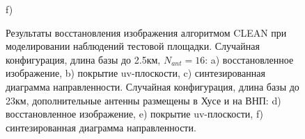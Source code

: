 \documentclass[10pt,a4paper]{article}
\begin{document}
\begin{figure}
\begin{minipage}[h]{0.47\linewidth}
\end{minipage}
\hfill
\begin{minipage}[h]{0.47\linewidth}
 f) \\
\end{minipage}

\caption{Результаты восстановления изображения алгоритмом CLEAN при моделировании наблюдений тестовой площадки. Случайная конфигурация, длина базы до 2.5км, $N_{ant}=16$: a) восстановленное изображение, b) покрытие uv-плоскости, c) синтезированная диаграмма направленности. Случайная конфигурация, длина базы до 23км, дополнительные антенны размещены в Хусе и на ВНП: d) восстановленное изображение, e) покрытие uv-плоскости, f) синтезированная диаграмма направленности.}
\label{fig:RIF32-rand_n16}
\end{figure}
\end{document}
